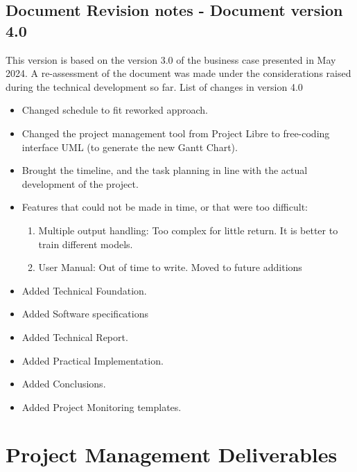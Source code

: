 \documentclass[a4paper, 11pt]{report}
\begin{document}
\section{Document Revision notes - Document version 4.0}
This version is based on the version 3.0 of the business case presented in May 2024. A re-assessment of the document was made under the considerations raised during the technical development so far. List of changes in version 4.0
\begin{itemize}
   \item Changed schedule to fit reworked approach.
   \item Changed the project management tool from Project Libre to free-coding interface UML (to generate the new Gantt Chart).
   \item Brought the timeline, and the task planning in line with the actual development of the project.
   \item Features that could not be made in time, or that were too difficult:
   \begin{enumerate}
       \item Multiple output handling: Too complex for little return. It is better to train different models.
       \item User Manual: Out of time to write. Moved to future additions
   \end{enumerate}
   \item Added Technical Foundation.
   \item Added Software specifications
   \item Added Technical Report.
   \item Added Practical Implementation.
   \item Added Conclusions.
   \item Added Project Monitoring templates.
\end{itemize}

\chapter{Project Management Deliverables}\label{Apx: Project Deliverables}







\end{document}
